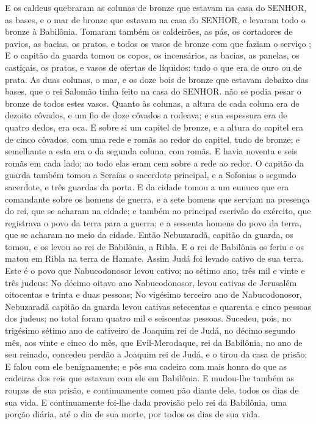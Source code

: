 {E os caldeus quebraram as colunas de bronze que estavam na casa do SENHOR, as bases, e o mar de bronze que estavam na casa do SENHOR, e levaram todo o bronze à Babilônia.
Tomaram também os caldeirões, as pás, os cortadores de pavios, as bacias, os pratos, e todos os vasos de bronze com que faziam o serviço
{} ;
E o capitão da guarda tomou os copos, os incensários, as bacias, as panelas, os castiçais, os pratos, e vasos de ofertas de líquidos: tudo o que era de ouro ou de prata.
As duas colunas, o mar, e os doze bois de bronze que estavam debaixo das bases, que o rei Salomão tinha feito na casa do SENHOR. não se podia pesar o bronze de todos estes vasos.
Quanto às colunas, a altura de cada coluna era de dezoito côvados, e um fio de doze côvados a rodeava; e sua espessura era de quatro dedos,
{} era oca.
E
{} sobre si um capitel de bronze, e a altura do capitel era de cinco côvados, com uma rede e romãs ao redor do capitel, tudo de bronze; e semelhante a esta era o da segunda coluna, com
{} romãs.
E havia noventa e seis romãs em cada lado; ao todo elas eram cem sobre a rede ao redor.
O capitão da guarda também tomou a Seraías o sacerdote principal, e a Sofonias o segundo sacerdote, e três guardas da porta.
E da cidade tomou a um eunuco que era comandante sobre os homens de guerra, e a sete homens que serviam na presença do rei, que se acharam na cidade; e também ao principal escrivão do exército, que registrava o povo da terra para a guerra; e a sessenta homens do povo da terra, que se acharam no meio da cidade.
Então Nebuzaradã, capitão da guarda, os tomou, e os levou ao rei de Babilônia, a Ribla.
E o rei de Babilônia os feriu e os matou em Ribla na terra de Hamate. Assim Judá foi levado cativo de sua terra.
Este é o povo que Nabucodonosor levou cativo; no sétimo ano, três mil e vinte e três judeus:
No décimo oitavo ano Nabucodonosor, levou cativas de Jerusalém oitocentas e trinta e duas pessoas;
No vigésimo terceiro ano de Nabucodonosor, Nebuzaradã capitão da guarda levou cativas setecentas e quarenta e cinco pessoas dos judeus; no total foram quatro mil e seiscentas pessoas.
Sucedeu, pois, no trigésimo sétimo ano de cativeiro de Joaquim rei de Judá, no décimo segundo mês, aos vinte e cinco do mês, que Evil-Merodaque, rei da Babilônia, no
{} ano de seu reinado, concedeu perdão a
 Joaquim rei de Judá, e o tirou da casa de prisão;
E falou com ele benignamente; e pôs sua cadeira com mais honra
 do que as cadeiras dos reis que estavam com ele em Babilônia.
E mudou-lhe também as roupas de sua prisão, e continuamente comeu pão diante dele, todos os dias de sua vida.
E continuamente foi-lhe dada provisão pelo rei da Babilônia, uma porção diária, até o dia de sua morte, por todos os dias de sua vida.\par }

